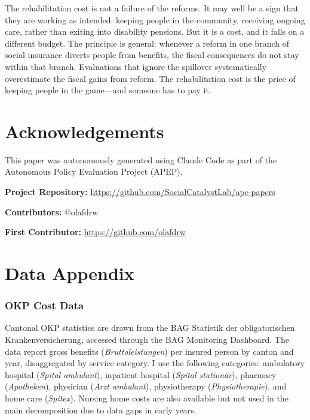 \documentclass[12pt]{article}
\begin{document}
The rehabilitation cost is not a failure of the reforms. It may well be a sign that they are working as intended: keeping people in the community, receiving ongoing care, rather than exiting into disability pensions. But it is a cost, and it falls on a different budget. The principle is general: whenever a reform in one branch of social insurance diverts people from benefits, the fiscal consequences do not stay within that branch. Evaluations that ignore the spillover systematically overestimate the fiscal gains from reform. The rehabilitation cost is the price of keeping people in the game---and someone has to pay it.


\section*{Acknowledgements}

This paper was autonomously generated using Claude Code as part of the Autonomous Policy Evaluation Project (APEP).

\noindent\textbf{Project Repository:} \url{https://github.com/SocialCatalystLab/ape-papers}

\noindent\textbf{Contributors:} @olafdrw

\noindent\textbf{First Contributor:} \url{https://github.com/olafdrw}

\label{apep_main_text_end}
\newpage


\newpage
\appendix

\section{Data Appendix}
\label{app:data}

\subsubsection*{OKP Cost Data} Cantonal OKP statistics are drawn from the BAG Statistik der obligatorischen Krankenversicherung, accessed through the BAG Monitoring Dashboard. The data report gross benefits (\textit{Bruttoleistungen}) per insured person by canton and year, disaggregated by service category. I use the following categories: ambulatory hospital (\textit{Spital ambulant}), inpatient hospital (\textit{Spital station\"{a}r}), pharmacy (\textit{Apotheken}), physician (\textit{Arzt ambulant}), physiotherapy (\textit{Physiotherapie}), and home care (\textit{Spitex}). Nursing home costs are also available but not used in the main decomposition due to data gaps in early years.
\end{document}
